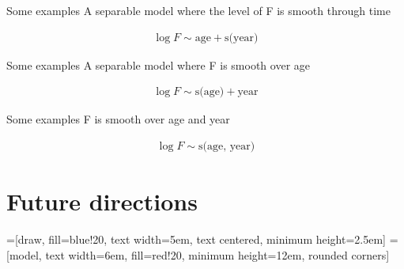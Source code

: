 \documentclass{beamer}\usepackage[]{graphicx}\usepackage[]{color}
\begin{document}
\begin{frame}{Some examples}
A separable model where the level of F is smooth through time

\begin{align*}
  \log F \sim \text{age} + \text{s(year)}
\end{align*}
\end{frame}


\begin{frame}{Some examples}
A separable model where F is smooth over age

\begin{align*}
  \log F \sim \text{s(age)} + \text{year}
\end{align*}
\end{frame}


\begin{frame}{Some examples}
F is smooth over age and year

\begin{align*}
  \log F \sim \text{s(age, year)}
\end{align*}
\end{frame}

\section{Future directions} %


=[draw, fill=blue!20, text width=5em, text centered, minimum height=2.5em]
 = [model, text width=6em, fill=red!20, minimum height=12em, rounded corners]
\def\blockdist{2.3}
\def\edgedist{2.5}
\end{document}

